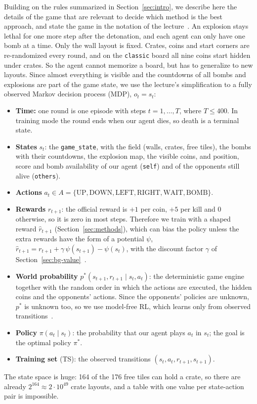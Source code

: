 \documentclass[11pt]{article}
\newcommand{\code}[1]{\texttt{#1}}
\begin{document}
Building on the rules summarized in Section~\ref{sec:intro}, we describe here the
details of the game that are relevant to decide which method is the best approach, and
state the game in the notation of the lecture~\cite{koethe2026mle}.
An explosion stays lethal for one more step after the detonation, and each
agent can only have one bomb at a time. Only the wall layout is fixed. Crates, coins and
start corners are re-randomized every round, and on the \code{classic} board all nine
coins start hidden under crates. So the agent cannot memorize a board, but has to
generalize to new layouts. Since almost everything is visible and the countdowns of all
bombs and explosions are part of the game state, we use the lecture's simplification to
a fully observed Markov decision process (MDP), $o_t = s_t$:
\begin{itemize}\setlength{\itemsep}{1pt}
  \item \textbf{Time:} one round is one episode with steps $t = 1,\dots,T$, where
        $T \le 400$. In training mode the round ends when our agent dies, so death is a
        terminal state.
  \item \textbf{States} $s_t$: the \code{game\_state}, with the field (walls, crates,
        free tiles), the bombs with their countdowns, the explosion map, the visible
        coins, and position, score and bomb availability of our agent (\code{self}) and
        of the opponents still alive (\code{others}).
  \item \textbf{Actions} $a_t \in A = \{\mathrm{UP}, \mathrm{DOWN}, \mathrm{LEFT},
        \mathrm{RIGHT}, \mathrm{WAIT}, \mathrm{BOMB}\}$.
  \item \textbf{Rewards} $r_{t+1}$: the official reward is $+1$ per coin, $+5$ per kill
        and $0$ otherwise, so it is zero in most steps. Therefore we train with a shaped
        reward $\hat r_{t+1}$ (Section~\ref{sec:methods}), which can bias the policy
        unless the extra rewards have the form of a potential $\psi$,
        $\hat r_{t+1} = r_{t+1} + \gamma\,\psi(s_{t+1}) - \psi(s_t)$, with the discount
        factor $\gamma$ of Section~\ref{sec:bg-value}~\cite{koethe2026mle,ng1999}.
  \item \textbf{World probability} $p^*(s_{t+1}, r_{t+1} \mid s_t, a_t)$: the
        deterministic game engine together with the random order in which the actions
        are executed, the hidden coins and the opponents' actions. Since the opponents'
        policies are unknown, $p^*$ is unknown too, so we use model-free RL, which learns
        only from observed transitions~\cite{koethe2026mle}.
  \item \textbf{Policy} $\pi(a_t \mid s_t)$: the probability that our agent plays $a_t$
        in $s_t$; the goal is the optimal policy $\pi^*$.
  \item \textbf{Training set} (TS): the observed transitions
        $(s_t, a_t, r_{t+1}, s_{t+1})$.
\end{itemize}
The state space is huge: 164 of the 176 free tiles can hold a crate, so there are already
$2^{164} \approx 2\cdot10^{49}$ crate layouts, and a table with one value per
state-action pair is impossible.
\end{document}
